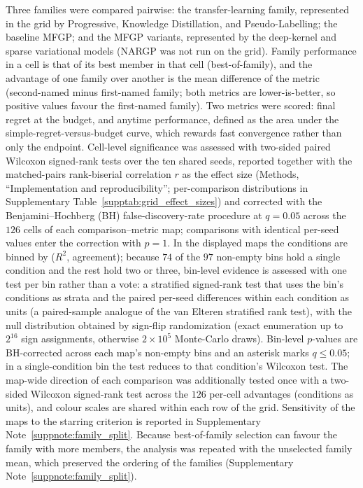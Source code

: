 \documentclass[11pt,a4paper]{article}%
\begin{document}
Three families were compared pairwise: the transfer-learning family, represented in
the grid by Progressive, Knowledge Distillation, and Pseudo-Labelling; the baseline
MFGP; and the MFGP variants, represented by the deep-kernel and sparse variational
models (NARGP was not run on the grid).
Family performance in a cell is that of its best member in that cell
(best-of-family), and the advantage of one family over another is the mean difference
of the metric (second-named minus first-named family; both metrics are
lower-is-better, so positive values favour the first-named family). Two metrics were
scored: final regret at the budget, and anytime performance, defined as the area
under the simple-regret-versus-budget curve, which rewards fast convergence rather
than only the endpoint. Cell-level significance was assessed with two-sided paired
Wilcoxon signed-rank tests over the ten shared seeds, reported together with the
matched-pairs rank-biserial correlation $r$ as the effect size (Methods,
``Implementation and reproducibility''; per-comparison distributions in Supplementary
Table~\ref{supptab:grid_effect_sizes}) and corrected with the Benjamini--Hochberg
(BH) false-discovery-rate procedure at $q = 0.05$ across the $126$ cells of each
comparison--metric map; comparisons with identical per-seed values enter the
correction with $p = 1$. In the displayed maps the conditions are binned by ($R^2$,
agreement); because $74$ of the $97$ non-empty bins hold a single condition and the
rest hold two or three, bin-level evidence is assessed with one test per bin rather
than a vote: a stratified signed-rank test that uses the bin's conditions as strata
and the paired per-seed differences within each condition as units (a paired-sample
analogue of the van Elteren stratified rank test), with the null distribution
obtained by sign-flip randomization (exact enumeration up to $2^{16}$ sign
assignments, otherwise $2\times10^{5}$ Monte-Carlo draws). Bin-level $p$-values are
BH-corrected across each map's non-empty bins and an asterisk marks $q \le 0.05$; in
a single-condition bin the test reduces to that condition's Wilcoxon test. The
map-wide direction of each comparison was additionally tested once with a two-sided
Wilcoxon signed-rank test across the $126$ per-cell advantages (conditions as
units), and colour scales are shared within each row of the grid. Sensitivity of the
maps to the starring criterion is reported in Supplementary
Note~\ref{suppnote:family_split}.
Because best-of-family selection can favour the family with more members, the
analysis was repeated with the unselected family mean, which preserved the ordering
of the families (Supplementary Note~\ref{suppnote:family_split}).
\end{document}

